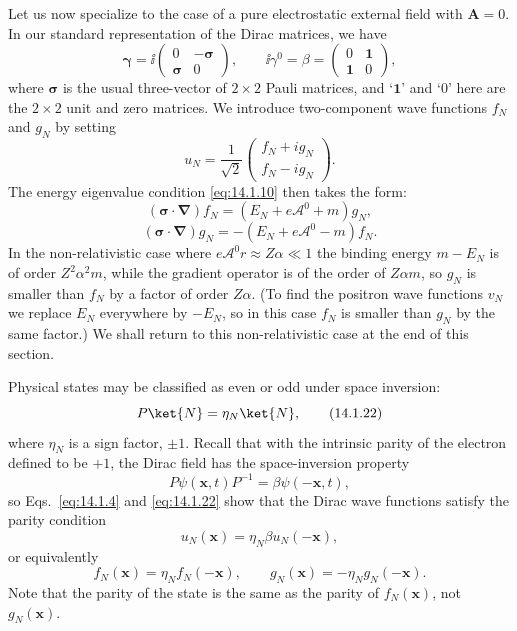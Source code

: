 Let us now specialize to the case of a pure electrostatic external field with
$\mathbf A=0$. In our standard representation of the Dirac matrices, we have
\[
  \boldsymbol\gamma=\ii\begin{pmatrix}0&-\boldsymbol\sigma\\
  \boldsymbol\sigma&0\end{pmatrix},\qquad
  \ii\gamma^0=\beta=\begin{pmatrix}0&\mathbf{1}\\\mathbf{1}&0\end{pmatrix},
\]
where $\boldsymbol\sigma$ is the usual three-vector of $2\times2$ Pauli
matrices, and `$\mathbf{1}$' and `$0$' here are the $2\times2$ unit and zero
matrices. We introduce two-component wave functions $f_N$ and $g_N$ by setting
\begin{equation}
  u_N=\frac1{\sqrt2}\begin{pmatrix}f_N+ig_N\\f_N-ig_N\end{pmatrix}.
  \tag{14.1.19}\label{eq:14.1.19}
\end{equation}
The energy eigenvalue condition \eqref{eq:14.1.10} then takes the form:
\begin{equation}
  (\boldsymbol\sigma\cdot\boldsymbol\nabla)f_N
  =(E_N+e\mathcal A^0+m)g_N,
  \tag{14.1.20}\label{eq:14.1.20}
\end{equation}
\begin{equation}
  (\boldsymbol\sigma\cdot\boldsymbol\nabla)g_N
  =-(E_N+e\mathcal A^0-m)f_N.
  \tag{14.1.21}\label{eq:14.1.21}
\end{equation}
In the non-relativistic case where $e\mathcal A^0r\approx Z\alpha\ll1$ the
binding energy $m-E_N$ is of order $Z^2\alpha^2m$, while the gradient operator
is of the order of $Z\alpha m$, so $g_N$ is smaller than $f_N$ by a factor of
order $Z\alpha$. (To find the positron wave functions $v_N$ we replace $E_N$
everywhere by $-E_N$, so in this case $f_N$ is smaller than $g_N$ by the same
factor.) We shall return to this non-relativistic case at the end of this
section.

Physical states may be classified as even or odd under space inversion:
\begin{equation}
  P\ket{N}=\eta_N\ket{N},
  \tag{14.1.22}\label{eq:14.1.22}
\end{equation}
where $\eta_N$ is a sign factor, $\pm1$. Recall that with the intrinsic parity
of the electron defined to be $+1$, the Dirac field has the space-inversion
property
\[
  P\psi(\mathbf x,t)P^{-1}=\beta\psi(-\mathbf x,t),
\]
so Eqs.~\eqref{eq:14.1.4} and \eqref{eq:14.1.22} show that the Dirac wave
functions satisfy the parity condition
\begin{equation}
  u_N(\mathbf x)=\eta_N\beta u_N(-\mathbf x),
  \tag{14.1.23}\label{eq:14.1.23}
\end{equation}
or equivalently
\begin{equation}
  f_N(\mathbf x)=\eta_Nf_N(-\mathbf x),\qquad
  g_N(\mathbf x)=-\eta_Ng_N(-\mathbf x).
  \tag{14.1.24}\label{eq:14.1.24}
\end{equation}
Note that the parity of the state is the same as the parity of $f_N(\mathbf x)$,
not $g_N(\mathbf x)$.

